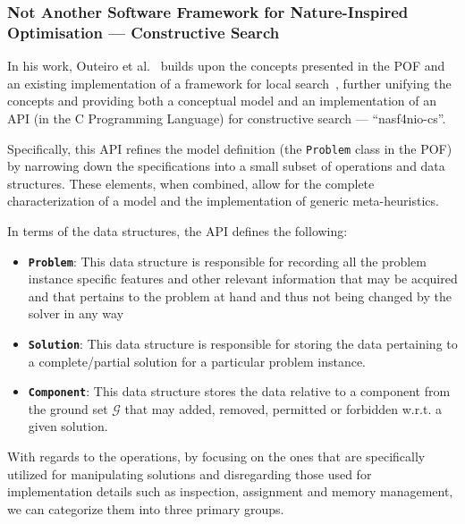 \subsubsection{Not Another Software Framework for Nature-Inspired Optimisation
    --- Constructive Search}

In his work, Outeiro et al.~\cite{outeiro2021application} builds upon the
concepts presented in the POF and an existing implementation of a framework for
local search~\cite{fonseca2021nasf4nio}, further unifying the concepts and
providing both a conceptual model and an implementation of an API (in the C
Programming Language) for constructive search --- ``nasf4nio-cs''.

Specifically, this API refines the model definition (the \texttt{Problem} class
in the POF) by narrowing down the specifications into a small subset of
operations and data structures. These elements, when combined, allow for the
complete characterization of a model and the implementation of generic
meta-heuristics.

In terms of the data structures, the API defines the following:

\begin{itemize}
    \item \textbf{\texttt{Problem}}: This data structure is responsible for recording
          all the problem instance specific features and other relevant information
          that may be acquired and that pertains to the problem at hand and thus not
          being changed by the solver in any way
    \item \textbf{\texttt{Solution}}: This data structure is responsible for storing the
          data pertaining to a complete/partial solution for a particular problem
          instance.
    \item \textbf{\texttt{Component}}: This data structure stores the data relative to a
          component from the ground set $\mathcal{G}$ that may added, removed, permitted
          or forbidden w.r.t. a given solution.
\end{itemize}

With regards to the operations, by focusing on the ones that are specifically
utilized for manipulating solutions and disregarding those used for
implementation details such as inspection, assignment and memory management, we can
categorize them into three primary groups.

